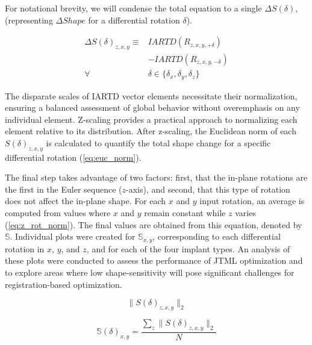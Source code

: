 For notational brevity, we will condense the total equation to a single $\Delta S(\delta)$, (representing $\Delta Shape$ for a differential rotation $\delta$).

\begin{equation}
	\label{eq:shape-derivative}
	\begin{split}
		\Delta S(\delta)_{z,x,y}  \equiv & IARTD(R_{z,x,y,+\delta})                        \\
		                                 & - IARTD(R_{z,x,y,-\delta})                      \\
		\forall                          & \delta \in \{\delta_{x},\delta_{y},\delta_{z}\}
	\end{split}
\end{equation}

The disparate scales of IARTD vector elements necessitate their normalization, ensuring a balanced assessment of global behavior without overemphasis on any individual element.
Z-scaling provides a practical approach to normalizing each element relative to its distribution.
After z-scaling, the Euclidean norm of each $S(\delta)_{z,x,y}$ is calculated to quantify the total shape change for a specific differential rotation (\cref{eq:euc_norm}).

The final step takes advantage of two factors: first, that the in-plane rotations are the first in the Euler sequence ($z$-axis), and second, that this type of rotation does not affect the in-plane shape.
For each $x$ and $y$ input rotation, an average is computed from values where $x$ and $y$ remain constant while $z$ varies (\cref{eq:z_rot_norm}). The final values are obtained from this equation, denoted by $\mathbb{S}$.
Individual plots were created for $\mathbb{S}_{x,y}$, corresponding to each differential rotation in $x$, $y$, and $z$, and for each of the four implant types.
An analysis of these plots were conducted to assess the performance of JTML optimization and to explore areas where low shape-sensitivity will pose significant challenges for registration-based optimization.

\begin{equation}
	\label{eq:euc_norm}
	\|S(\delta)_{z,x,y}\|_{2}
\end{equation}

\begin{equation}
	\label{eq:z_rot_norm}
	\mathbb{S}(\delta)_{x,y} = \dfrac{\sum_{z} \| S(\delta)_{z,x,y} \|_{2}}{N}
\end{equation}


